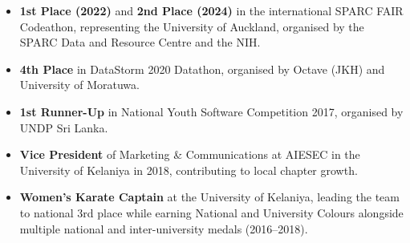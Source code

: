 \documentclass[12pt,a4paper,withhyper]{altacv}
\begin{document}
\medskip

\begin{itemize}
    \item \textbf{1st Place (2022)} and \textbf{2nd Place (2024)} in the international SPARC FAIR Codeathon, representing the University of Auckland, organised by the SPARC Data and Resource Centre and the NIH.
    \item \textbf{4th Place} in DataStorm 2020 Datathon, organised by Octave (JKH) and University of Moratuwa.
    \item \textbf{1st Runner-Up} in National Youth Software Competition 2017, organised by UNDP Sri Lanka.

    \item \textbf{Vice President} of Marketing \& Communications at AIESEC in the University of Kelaniya in 2018, contributing to local chapter growth.

    \item \textbf{Women's Karate Captain} at the University of Kelaniya, leading the team to national 3rd place while earning National and University Colours alongside multiple national and inter-university medals (2016--2018).


\end{itemize}



\medskip






\end{document}
